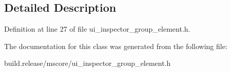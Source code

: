 \subsection{Detailed Description}


Definition at line 27 of file ui\+\_\+inspector\+\_\+group\+\_\+element.\+h.



The documentation for this class was generated from the following file\+:\begin{DoxyCompactItemize}
\item 
build.\+release/mscore/ui\+\_\+inspector\+\_\+group\+\_\+element.\+h\end{DoxyCompactItemize}
